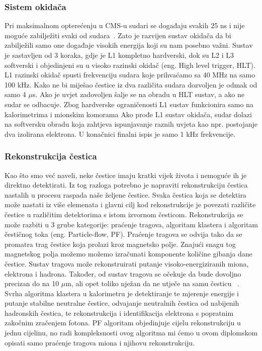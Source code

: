 \documentclass[12pt,a4paper,oneside]{article}
\begin{document}
\begin{linenumbers}
		\subsubsection{Sistem okidača}
		Pri maksimalnom opterećenju u CMS-u sudari se događaju svakih 25 ns i nije moguće zabilježiti svaki od sudara~\cite{doktorat}. Zato je razvijen sustav okidača da bi zabilježili samo one događaje visokih energija  koji su nam posebno važni. Sustav je sastavljen od 3 koraka, gdje je L1 kompletno hardverski, dok su L2 i L3 softverski i objedinjeni su u visoko razinski okidač (eng. High level trigger, HLT). L1 razinski okidač spusti frekvenciju sudara koje prihvaćamo sa 40 MHz na samo 100 kHz. Kako ne bi miješao čestice iz dva različita sudara dozvoljen je odmak od samo 4 {$\mu$}s. Ako je uvjet zadovoljen šalje se na obradu u HLT sustav, a ako ne sudar se odbacuje. Zbog hardverske ograničenosti L1 sustav funkcionira samo na kalorimetrima i mionskim komorama
		Ako prođe L1 sustav okidača, sudar dolazi na softversku obradu koja zahtjeva ispunjavanje raznih uvjeta kao npr. postojanje dva izolirana elektrona.  U konačnici finalni ispis je samo 1 kHz frekvencije.
		
		\subsubsection{Rekonstrukcija čestica}
		Kao što smo već naveli, neke čestice imaju kratki vijek života i nemoguće ih je direktno detektirati. Iz tog razloga potrebno je napraviti rekonstrukciju čestica nastalih u procesu raspada naše željene čestice. Svaka čestica koja se detektira može nastati iz više elemenata i glavni cilj kod rekonstrukcije je povezati različite čestice u različitim detektorima s istom izvornom česticom. 
		Rekonstrukcija se može razbiti u 3 grube kategorije: praćenje tragova, algoritam klastera i algoritam čestičnog toka (eng. Particle-flow, PF).
		Praćenje tragova se odvija tako da se promatra trag čestice koja prolazi kroz magnetsko polje. Znajući snagu tog magnetskog polja možemo možemo izračunati komponente količine gibanja dane čestice. Sustav tragova može rekonstruirati putanje visoko-energiziranih miona, elektrona i hadrona. Također, od sustav tragova se očekuje da bude dovoljno precizan do na 10 $\mu$m, ali opet toliko nježan da ne utječe na samu česticu ~\cite{cern-sustav tragova}.
		Svrha algoritma klastera u kalorimetru je detektiranje te mjerenje energije i putanje stabilne neutralne čestice, odvajanje neutralnih čestica od nabijenih hadronskih čestica, te rekonstrukcija i identifikacija elektrona s popratnim zakočnim zračenjem fotona.
		PF algoritam objedinjuje cijelu rekonstrukciju u jednu cijelinu, no radi kompleksnosti ovog algoritma mi ćemo u ovom diplomskom opisati samo praćenje tragova miona i njihovu rekonstrukciju.
		

\end{linenumbers}
\end{document}
